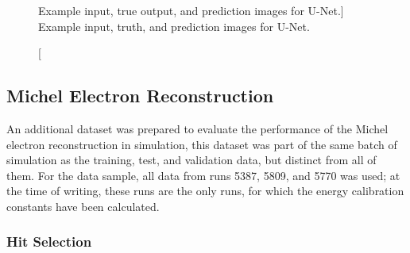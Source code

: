 \begin{figure}
	\caption
	[Example input, true output, and prediction images for U-Net.]
	{Example input, truth, and prediction images for U-Net.}
	\label{fig:unet_example}
\end{figure}

\subsection{Michel Electron Reconstruction}

An additional dataset was prepared to evaluate the performance of the Michel
electron reconstruction in simulation, this dataset was part of the same batch 
of simulation as the training, test, and validation data, but distinct from 
all of them. For the \protodune{} data sample, all data from runs 5387, 5809, 
and 5770 was used; at the time of writing, these runs are the only runs, for 
which the energy calibration constants have been calculated.

\subsubsection{Hit Selection}

